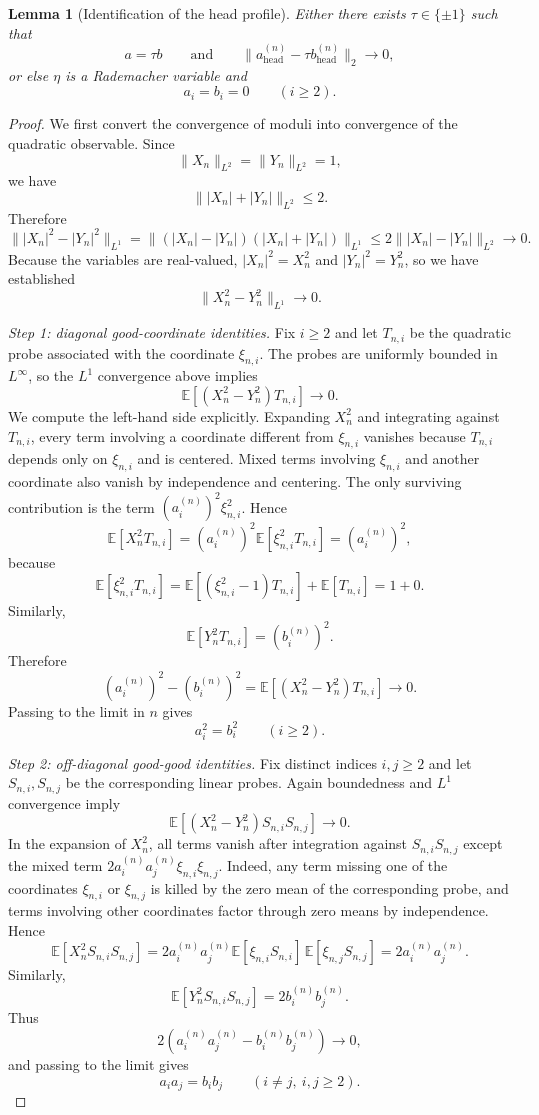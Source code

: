 \documentclass[11pt]{amsart}
\numberwithin{equation}{section}
\newtheorem{lemma}[theorem]{Lemma}
\theoremstyle{definition}
\theoremstyle{remark}
\newcommand{\E}{\mathbb E}
\newcommand{\norm}[1]{\lVert #1 \rVert}
\begin{document}
\begin{lemma}[Identification of the head profile]\label{lem:head-sign}
Either there exists $\tau\in\{\pm1\}$ such that
\[
a=\tau b
\qquad\text{and}\qquad
\norm{a_{\mathrm{head}}^{(n)}-\tau b_{\mathrm{head}}^{(n)}}_2\to0,
\]
or else $\eta$ is a Rademacher variable and
\[
a_i=b_i=0
\qquad(i\ge2).
\]
\end{lemma}

\begin{proof}
We first convert the convergence of moduli into convergence of the quadratic
observable.  Since
\[
\norm{X_n}_{L^2}=\norm{Y_n}_{L^2}=1,
\]
we have
\[
\norm{|X_n|+|Y_n|}_{L^2}\le 2.
\]
Therefore
\[
\norm{|X_n|^2-|Y_n|^2}_{L^1}
=\norm{(|X_n|-|Y_n|)(|X_n|+|Y_n|)}_{L^1}
\le 2\norm{|X_n|-|Y_n|}_{L^2}
\longrightarrow0.
\]
Because the variables are real-valued, $|X_n|^2=X_n^2$ and $|Y_n|^2=Y_n^2$,
so we have established
\[
\norm{X_n^2-Y_n^2}_{L^1}\longrightarrow0.
\]

\smallskip
\noindent\emph{Step 1: diagonal good-coordinate identities.}
Fix $i\ge2$ and let $T_{n,i}$ be the quadratic probe associated with the
coordinate $\xi_{n,i}$.  The probes are uniformly bounded in $L^\infty$, so the
$L^1$ convergence above implies
\[
\E[(X_n^2-Y_n^2)T_{n,i}]\longrightarrow0.
\]
We compute the left-hand side explicitly.  Expanding $X_n^2$ and integrating
against $T_{n,i}$, every term involving a coordinate different from
$\xi_{n,i}$ vanishes because $T_{n,i}$ depends only on $\xi_{n,i}$ and is
centered.  Mixed terms involving $\xi_{n,i}$ and another coordinate also
vanish by independence and centering.  The only surviving contribution is the
term $(a_i^{(n)})^2\xi_{n,i}^2$.  Hence
\[
\E[X_n^2T_{n,i}]
=(a_i^{(n)})^2\E[\xi_{n,i}^2T_{n,i}]
=(a_i^{(n)})^2,
\]
because
\[
\E[\xi_{n,i}^2T_{n,i}]
=\E[(\xi_{n,i}^2-1)T_{n,i}]+\E[T_{n,i}]
=1+0.
\]
Similarly,
\[
\E[Y_n^2T_{n,i}]=(b_i^{(n)})^2.
\]
Therefore
\[
(a_i^{(n)})^2-(b_i^{(n)})^2
=\E[(X_n^2-Y_n^2)T_{n,i}]
\longrightarrow0.
\]
Passing to the limit in $n$ gives
\[
a_i^2=b_i^2
\qquad(i\ge2).
\]

\smallskip
\noindent\emph{Step 2: off-diagonal good-good identities.}
Fix distinct indices $i,j\ge2$ and let $S_{n,i},S_{n,j}$ be the corresponding
linear probes.  Again boundedness and $L^1$ convergence imply
\[
\E[(X_n^2-Y_n^2)S_{n,i}S_{n,j}]\longrightarrow0.
\]
In the expansion of $X_n^2$, all terms vanish after integration against
$S_{n,i}S_{n,j}$ except the mixed term
$2a_i^{(n)}a_j^{(n)}\xi_{n,i}\xi_{n,j}$.  Indeed, any term missing one of the
coordinates $\xi_{n,i}$ or $\xi_{n,j}$ is killed by the zero mean of the
corresponding probe, and terms involving other coordinates factor through zero
means by independence.  Hence
\[
\E[X_n^2S_{n,i}S_{n,j}]
=2a_i^{(n)}a_j^{(n)}
\E[\xi_{n,i}S_{n,i}]\,\E[\xi_{n,j}S_{n,j}]
=2a_i^{(n)}a_j^{(n)}.
\]
Similarly,
\[
\E[Y_n^2S_{n,i}S_{n,j}]
=2b_i^{(n)}b_j^{(n)}.
\]
Thus
\[
2(a_i^{(n)}a_j^{(n)}-b_i^{(n)}b_j^{(n)})\longrightarrow0,
\]
and passing to the limit gives
\[
a_ia_j=b_ib_j
\qquad(i\ne j,\ i,j\ge2).
\]


\end{proof}
\end{document}
